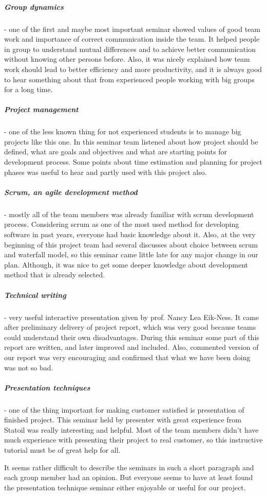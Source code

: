 	\subparagraph{Group dynamics} - one of the first and maybe most important seminar showed values of good team work and importance of correct communication inside the team. It helped people in group to understand mutual differences and to achieve better communication without knowing other persons before. Also, it was nicely explained how team work should lead to better efficiency and more productivity, and it is always good to hear something about that from experienced people working with big groups for a long time.
	\subparagraph{Project management} - one of the less known thing for not experienced students is to manage big projects like this one. In this seminar team listened about how project should be defined, what are goals and objectives and what are starting points for development process. Some points about time estimation and planning for project phases was useful to hear and partly used with this project also.
	\subparagraph{Scrum, an agile development method} - mostly all of the team members was already familiar with scrum development process. Considering scrum as one of the most used method for developing software in past years, everyone had basic knowledge about it. Also, at the very beginning of this project team had several discusses about choice between scrum and waterfall model, so this seminar came little late for any major change in our plan. Although, it was nice to get some deeper knowledge about development method that is already selected.
	\subparagraph{Technical writing} - very useful interactive presentation given by prof. Nancy Lea Eik-Ness. It came after preliminary delivery of project report, which was very good because teams could understand their own disadvantages. During this seminar some part of this report are written, and later improved and included. Also, commented version of our report was very encouraging and confirmed that what we have been doing was not so bad.
	\subparagraph{Presentation techniques} - one of the thing important for making customer satisfied is presentation of finished project. This seminar held by presenter with great experience from Statoil was really interesting and helpful. Most of the team members didn't have much experience with presenting their project to real customer, so this instructive tutorial must be of great help for all.

It seems rather difficult to describe the seminars in such a short paragraph and each group member had an opinion. But everyone seems to have at least found the presentation technique seminar either enjoyable or useful for our project.


